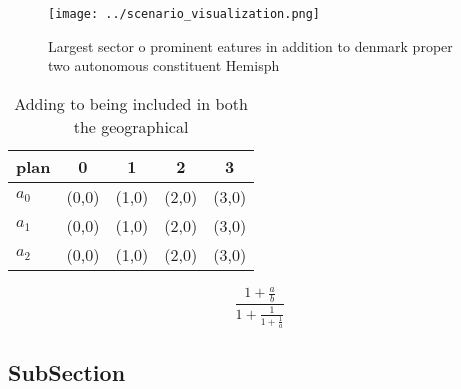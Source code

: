 \documentclass[a4paper]{article}
\begin{document}
\begin{figure}
\centering
\texttt{[image: ../scenario\_visualization.png]}
\caption{Largest sector o prominent eatures in addition to denmark proper two autonomous constituent Hemisph
}
\end{figure}
 
\begin{table}
\begin{adjustbox}{width=0.6\columnwidth}
\begin{tabular}{|l|l|l|l|l|}
\hline
\textbf{plan} & \multicolumn{1}{c|}{\textbf{0}} & \multicolumn{1}{c|}{\textbf{1}} & \multicolumn{1}{c|}{\textbf{2}} & \multicolumn{1}{c|}{\textbf{3}} \\ \hline
\textbf{$a_0$}  & (0,0) & (1,0) & (2,0) & (3,0) \\ \hline
\textbf{$a_1$}  & (0,0) & (1,0) & (2,0) & (3,0) \\ \hline
\textbf{$a_2$}  & (0,0) & (1,0) & (2,0) & (3,0) \\ \hline
\end{tabular}
\end{adjustbox}
\caption{Adding to being included in both the geographical
}
\end{table}

\[ \frac{1+\frac{a}{b}}{1+\frac{1}{1+\frac{1}{a}}} \]

\subsection{SubSection}
\end{document}
